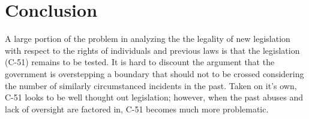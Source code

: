 \documentclass[a4paper, 11pt]{article} %
\begin{document}
\section*{Conclusion}
A large portion of the problem in analyzing the the legality of new legislation with respect to the rights of individuals and previous laws is that the legislation (C-51) remains to be tested. It is hard to discount the argument that the government is overstepping a boundary that should not to be crossed considering the number of similarly circumstanced incidents in the past. Taken on it's own, C-51 looks to be well thought out legislation; however, when the past abuses and lack of oversight are factored in, C-51 becomes much more problematic.







\end{document}
